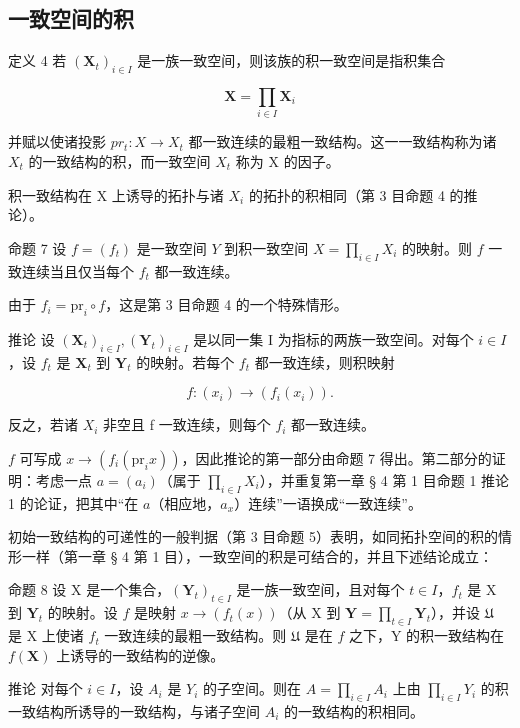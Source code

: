 \subsection{一致空间的积}

定义 4 若 \((\mathbf{X}_t)_{i\in I}\) 是一族一致空间，则该族的积一致空间是指积集合

\[
\mathbf {X} = \prod_ {i \in I} \mathbf {X} _ {i}
\]

并赋以使诸投影 \(pr_{t}: X \rightarrow X_{t}\) 都一致连续的最粗一致结构。这一一致结构称为诸 \(X_{t}\) 的一致结构的积，而一致空间 \(X_{t}\) 称为 X 的因子。

积一致结构在 X 上诱导的拓扑与诸 \(X_{i}\) 的拓扑的积相同（第 3 目命题 4 的推论）。

命题 7 设 \(f = (f_{t})\) 是一致空间 \(Y\) 到积一致空间 \(X = \prod_{i \in I} X_{i}\) 的映射。则 \(f\) 一致连续当且仅当每个 \(f_{t}\) 都一致连续。

由于 \(f_{i} = \mathrm{pr}_{i} \circ f\)，这是第 3 目命题 4 的一个特殊情形。

推论 设 \((\mathbf{X}_t)_{i \in I}, (\mathbf{Y}_t)_{i \in I}\) 是以同一集 I 为指标的两族一致空间。对每个 \(i \in I\)，设 \(f_t\) 是 \(\mathbf{X}_t\) 到 \(\mathbf{Y}_t\) 的映射。若每个 \(f_t\) 都一致连续，则积映射

\[
f: (x _ {i}) \rightarrow (f _ {i} (x _ {i})).
\]

反之，若诸 \(X_{i}\) 非空且 f 一致连续，则每个 \(f_{i}\) 都一致连续。

\(f\) 可写成 \(x \to (f_{i}(\mathrm{pr}_{i}x))\)，因此推论的第一部分由命题 7 得出。第二部分的证明：考虑一点 \(a = (a_{i})\)（属于 \(\prod_{i \in I} X_{i}\)），并重复第一章 § 4 第 1 目命题 1 推论 1 的论证，把其中“在 \(a\)（相应地，\(a_{x}\)）连续”一语换成“一致连续”。

初始一致结构的可递性的一般判据（第 3 目命题 5）表明，如同拓扑空间的积的情形一样（第一章 § 4 第 1 目），一致空间的积是可结合的，并且下述结论成立：

命题 8 设 X 是一个集合，\((\mathbf{Y}_t)_{t \in I}\) 是一族一致空间，且对每个 \(t \in I\)，\(f_t\) 是 X 到 \(\mathbf{Y}_t\) 的映射。设 \(f\) 是映射 \(x \to (f_t(x))\)（从 X 到 \(\mathbf{Y} = \prod_{t \in I} \mathbf{Y}_t\)），并设 \(\mathfrak{U}\) 是 X 上使诸 \(f_t\) 一致连续的最粗一致结构。则 \(\mathfrak{U}\) 是在 \(f\) 之下，Y 的积一致结构在 \(f(\mathbf{X})\) 上诱导的一致结构的逆像。

推论 对每个 \(i \in I\)，设 \(A_{i}\) 是 \(Y_{i}\) 的子空间。则在 \(A = \prod_{i \in I} A_{i}\) 上由 \(\prod_{i \in I} Y_{i}\) 的积一致结构所诱导的一致结构，与诸子空间 \(A_{i}\) 的一致结构的积相同。

